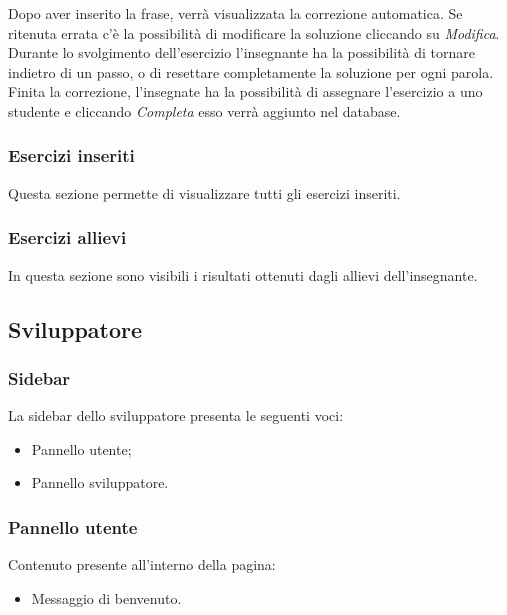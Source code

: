           Dopo aver inserito la frase, verrà visualizzata la correzione automatica. Se ritenuta errata c'è la possibilità di modificare la soluzione cliccando su \textit{Modifica}. Durante lo svolgimento dell'esercizio l'insegnante ha la possibilità di tornare indietro di un passo, o di resettare completamente la soluzione per ogni parola. Finita la correzione, l'insegnate ha la possibilità di assegnare l'esercizio a uno studente e cliccando \textit{Completa} esso verrà aggiunto nel database.
        
        
        
        \subsubsection{Esercizi inseriti}
        Questa sezione permette di visualizzare tutti gli esercizi inseriti.
        
        
        
        
        \subsubsection{Esercizi allievi}        
          In questa sezione sono visibili i risultati ottenuti dagli allievi dell'insegnante.
        
        
        
        
	\newpage
    \subsection{Sviluppatore}
    
    	\subsubsection{Sidebar} 
    	  La sidebar dello sviluppatore presenta le seguenti voci:
    		\begin{itemize}
    			\item Pannello utente;
    			\item Pannello sviluppatore.
    		\end{itemize}
    
    
    
    
    	\subsubsection{Pannello utente}
    	  Contenuto presente all'interno della pagina:
        	\begin{itemize} 
        		\item Messaggio di benvenuto.
        	\end{itemize}




